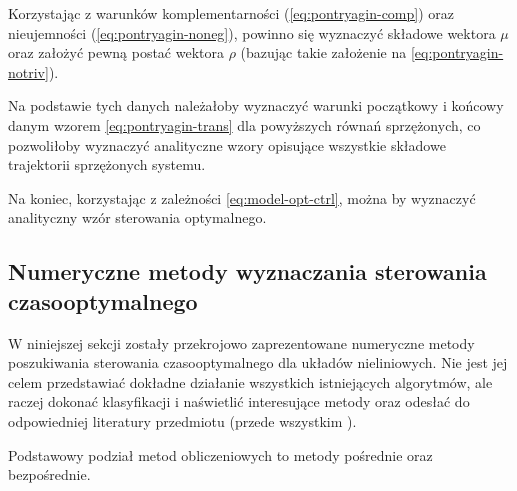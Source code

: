 Korzystając z warunków komplementarności (\ref{eq:pontryagin-comp}) oraz nieujemności (\ref{eq:pontryagin-noneg}), powinno się wyznaczyć składowe wektora $\mu$ oraz założyć pewną postać wektora $\rho$ (bazując takie założenie na \ref{eq:pontryagin-notriv}).

Na podstawie tych danych należałoby wyznaczyć warunki początkowy i końcowy danym wzorem \ref{eq:pontryagin-trans} dla powyższych równań sprzężonych, co pozwoliłoby wyznaczyć analityczne wzory opisujące wszystkie składowe trajektorii sprzężonych systemu.

Na koniec, korzystając z zależności \ref{eq:model-opt-ctrl}, można by wyznaczyć analityczny wzór sterowania optymalnego.


\subsection{Numeryczne metody wyznaczania sterowania czasooptymalnego}
\label{sub:toc-num}

W niniejszej sekcji zostały przekrojowo zaprezentowane numeryczne metody poszukiwania sterowania czasooptymalnego dla układów nieliniowych.
Nie jest jej celem przedstawiać dokładne działanie wszystkich istniejących algorytmów, ale raczej dokonać klasyfikacji i naświetlić interesujące metody oraz odesłać do odpowiedniej literatury przedmiotu (przede wszystkim \cite{Betts98}).

Podstawowy podział metod obliczeniowych to metody pośrednie oraz bezpośrednie.


